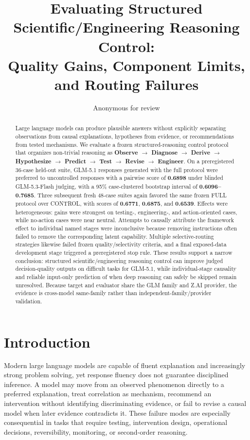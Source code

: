 \documentclass[11pt]{article}
\title{Evaluating Structured Scientific/Engineering Reasoning Control:\\Quality Gains, Component Limits, and Routing Failures}
\author{Anonymous for review}
\date{}
\begin{document}
\maketitle

\begin{abstract}
Large language models can produce plausible answers without explicitly separating observations from causal explanations, hypotheses from evidence, or recommendations from tested mechanisms. We evaluate a frozen structured-reasoning control protocol that organizes non-trivial reasoning as \textbf{Observe $\rightarrow$ Diagnose $\rightarrow$ Derive $\rightarrow$ Hypothesize $\rightarrow$ Predict $\rightarrow$ Test $\rightarrow$ Revise $\rightarrow$ Engineer}. On a preregistered 36-case held-out suite, GLM-5.1 responses generated with the full protocol were preferred to uncontrolled responses with a pairwise score of \textbf{0.6898} under blinded GLM-5.3-Flash judging, with a 95\% case-clustered bootstrap interval of \textbf{0.6096--0.7685}. Three subsequent fresh 48-case suites again favored the same frozen FULL protocol over CONTROL, with scores of \textbf{0.6771}, \textbf{0.6875}, and \textbf{0.6539}. Effects were heterogeneous: gains were strongest on testing-, engineering-, and action-oriented cases, while no-action cases were near neutral. Attempts to causally attribute the framework effect to individual named stages were inconclusive because removing instructions often failed to remove the corresponding latent capability. Multiple selective-routing strategies likewise failed frozen quality/selectivity criteria, and a final exposed-data development stage triggered a preregistered stop rule. These results support a narrow conclusion: structured scientific/engineering reasoning control can improve judged decision-quality outputs on difficult tasks for GLM-5.1, while individual-stage causality and reliable input-only prediction of when deep reasoning can safely be skipped remain unresolved. Because target and evaluator share the GLM family and Z.AI provider, the evidence is cross-model same-family rather than independent-family/provider validation.
\end{abstract}

\section{Introduction}
Modern large language models are capable of fluent explanation and increasingly strong problem solving, yet response fluency does not guarantee disciplined inference. A model may move from an observed phenomenon directly to a preferred explanation, treat correlation as mechanism, recommend an intervention without identifying discriminating evidence, or fail to revise a causal model when later evidence contradicts it. These failure modes are especially consequential in tasks that require testing, intervention design, operational decisions, reversibility, monitoring, or second-order reasoning.
\end{document}

